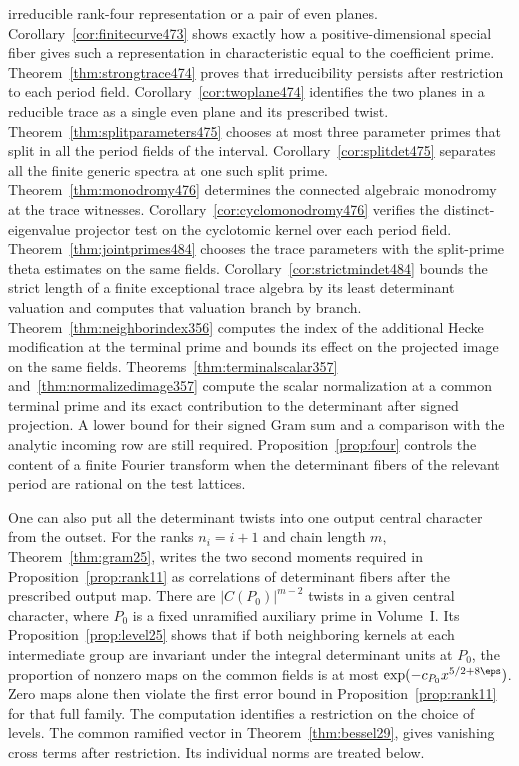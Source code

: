 \documentclass[a4paper,11pt]{article}
\theoremstyle{definition}
\theoremstyle{remark}
\numberwithin{equation}{section}
\begin{document}
irreducible rank-four representation or a pair of even planes. Corollary~\ref{cor:finitecurve473} shows exactly how a positive-dimensional special fiber gives such a representation in characteristic equal to the coefficient prime. Theorem~\ref{thm:strongtrace474} proves that irreducibility persists after restriction to each period field. Corollary~\ref{cor:twoplane474} identifies the two planes in a reducible trace as a single even plane and its prescribed twist. Theorem~\ref{thm:splitparameters475} chooses at most three parameter primes that split in all the period fields of the interval. Corollary~\ref{cor:splitdet475} separates all the finite generic spectra at one such split prime. Theorem~\ref{thm:monodromy476} determines the connected algebraic monodromy at the trace witnesses. Corollary~\ref{cor:cyclomonodromy476} verifies the distinct-eigenvalue projector test on the cyclotomic kernel over each period field. Theorem~\ref{thm:jointprimes484} chooses the trace parameters with the split-prime theta estimates on the same fields. Corollary~\ref{cor:strictmindet484} bounds the strict length of a finite exceptional trace algebra by its least determinant valuation and computes that valuation branch by branch. Theorem~\ref{thm:neighborindex356} computes the index of the additional Hecke modification at the terminal prime and bounds its effect on the projected image on the same fields. Theorems~\ref{thm:terminalscalar357} and~\ref{thm:normalizedimage357} compute the scalar normalization at a common terminal prime and its exact contribution to the determinant after signed projection. A lower bound for their signed Gram sum and a comparison with the analytic incoming row are still required. Proposition~\ref{prop:four} controls the content of a finite Fourier transform when the determinant fibers of the relevant period are rational on the test lattices.

One can also put all the determinant twists into one output central character from the outset. For the ranks \(n_i=i+1\) and chain length \(m\), Theorem~\ref{thm:gram25}, writes the two second moments required in Proposition~\ref{prop:rank11} as correlations of determinant fibers after the prescribed output map. There are \(|C(P_0)|^{m-2}\) twists in a given central character, where \(P_0\) is a fixed unramified auxiliary prime in Volume~I. Its Proposition~\ref{prop:level25} shows that if both neighboring kernels at each intermediate group are invariant under the integral determinant units at \(P_0\), the proportion of nonzero maps on the common fields is at most \(\exp(-c_{P_0}x^{5/2+8\eps})\). Zero maps alone then violate the first error bound in Proposition~\ref{prop:rank11} for that full family. The computation identifies a restriction on the choice of levels. The common ramified vector in Theorem~\ref{thm:bessel29}, gives vanishing cross terms after restriction. Its individual norms are treated below.
\end{document}
